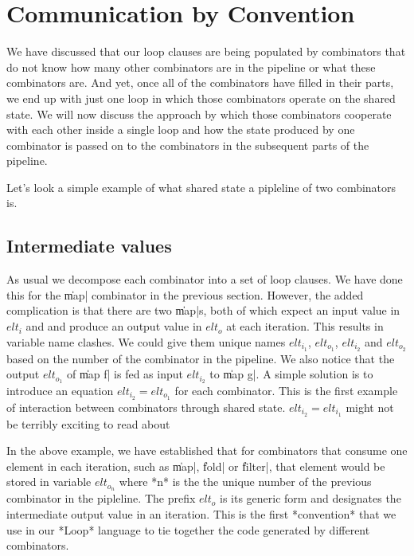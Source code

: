 \documentclass[preamble.tex]{subfiles}
\begin{document}
\section{Communication by Convention}

We have discussed that our loop clauses are being populated by combinators that do not know how many other combinators are in the pipeline or what these combinators are. And yet, once all of the combinators have filled in their parts, we end up with just one loop in which those combinators operate on the shared state. We will now discuss the approach by which those combinators cooperate with each other inside a single loop and how the state produced by one combinator is passed on to the combinators in the subsequent parts of the pipeline.

Let's look a simple example of what shared state a pipleline of two combinators  is.


\subsection{Intermediate values}
\label{sec:Loop:Elts}

As usual we decompose each combinator into a set of loop clauses. We have done this for the \|map| combinator in the previous section. However, the added complication is that there are two \|map|s, both of which expect an input value in $elt_i$ and and produce an output value in $elt_o$ at each iteration. This results in variable name clashes. We could give them unique names $elt_{i_1}$, $elt_{o_1}$, $elt_{i_2}$ and $elt_{o_2}$ based on the number of the combinator in the pipeline. We also notice that the output $elt_{o_1}$ of \|map f| is fed as input $elt_{i_2}$ to \|map g|. A simple solution is to introduce an equation $elt_{i_2} = elt_{o_1}$ for each combinator. This is the first example of interaction between combinators through shared state.
 $elt_{i_2} = elt_{i_1}$ might not be terribly exciting to read about

In the above example, we have established that for combinators that consume one element in each iteration, such as \|map|, \|fold| or \|filter|, that element would be stored in variable $elt_{o_n}$ where *n* is the the unique number of the previous combinator in the pipleline. The prefix $elt_o$ is its generic form and designates the intermediate output value in an iteration. This is the first *convention* that we use in our *Loop* language to tie together the code generated by different combinators.
\end{document}
